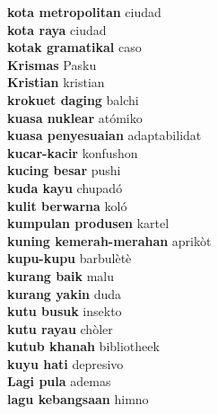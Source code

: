 \textbf{ kota metropolitan  } ciudad \\
\textbf{ kota raya  } ciudad \\
\textbf{ kotak gramatikal  } caso \\
\textbf{ Krismas  } Pasku \\
\textbf{ Kristian  } kristian \\
\textbf{ krokuet daging  } balchi \\
\textbf{ kuasa nuklear  } atómiko \\
\textbf{ kuasa penyesuaian  } adaptabilidat \\
\textbf{ kucar-kacir  } konfushon \\
\textbf{ kucing besar  } pushi \\
\textbf{ kuda kayu  } chupadó \\
\textbf{ kulit berwarna  } koló \\
\textbf{ kumpulan produsen  } kartel \\
\textbf{ kuning kemerah-merahan  } aprikòt \\
\textbf{ kupu-kupu  } barbulètè \\
\textbf{ kurang baik  } malu \\
\textbf{ kurang yakin  } duda \\
\textbf{ kutu busuk  } insekto \\
\textbf{ kutu rayau  } chòler \\
\textbf{ kutub khanah  } bibliotheek \\
\textbf{ kuyu hati  } depresivo \\
\textbf{ Lagi pula  } ademas \\
\textbf{ lagu kebangsaan  } himno \\
